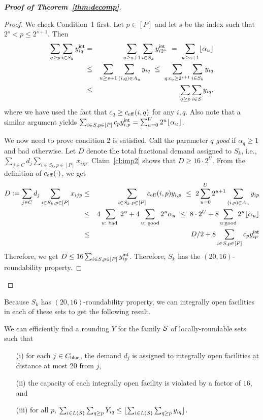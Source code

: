 \begin{proof}[{\bf Proof of Theorem~\ref{thm:decomp}}]
\begin{proof}
We check Condition~1 first. Let $p \in [P]$ and let $s$ be the index such that $2^s < p \leq 2^{s+1}$. Then
\begin{eqnarray*}
\sum_{q \geq p} \sum_{i \in S_k} \y_{iq} & = & \sum_{u \geq s+1} \sum_{i \in S_k} \y_{i2^u} \ = \ \sum_{u \geq s+1} \floor{\alpha_u }\\
& \leq & \sum_{u \geq s+1} \sum_{(i,q) \in A_u} y_{iq} \ \leq \ \sum_{q: c_q \geq 2^{s+1}} \sum_{i \in S_k} y_{iq} \\
& \leq & \sum_{q \geq p}\sum_{i\in S} y_{iq},
\end{eqnarray*}
 where we have used the fact that $c_q \geq c_{\mathrm{eff}}(i,q)$ for any $i,q$.
Also note that a similar argument yields $\sum_{i\in S,p\in [P]} c_p y^{{\mathsf{int}}}_{i,p} = \sum_{u=0}^U 2^u\lfloor\alpha_u\rfloor$.

We now need to prove condition 2 is satisfied. \smallskip
Call the parameter $q$ {\em good} if $\alpha_q \geq 1$ and bad otherwise. Let $D$ denote the total fractional demand assigned to $S_k$, i.e.,
$\sum_{j\in C} d_j \sum_{i\in S_k,p\in [P]} x_{ijp}$. Claim~\ref{cl:imp2} shows that $D \geq 16 \cdot 2^U$.
From the definition of $c_{\mathrm{eff}}(\cdot)$, we get
\begin{eqnarray*}
D := \sum_{j\in C} d_j \sum_{i\in S_k,p\in [P]} x_{ijp} & \leq &  \sum_{i\in S_k,p\in [P]} c_{\mathrm{eff}}(i,p)y_{i,p}	\  \leq \ 2 \sum_{u=0}^U 2^{u+1} \sum_{(i,p)\in A_u} y_{ip} \\
																				& \leq & 4\sum_{u: \textrm{ bad }} 2^u + 4\sum_{u: \textrm{ good}} 2^u \alpha_u
																				\  \leq \  8\cdot 2^U + 8\sum_{u: \textrm{good}}2^u \lfloor\alpha_u\rfloor  \\
																				& \leq & D/2 + 8\sum_{i\in S,p\in [P]}c_py^{{\mathsf{int}}}_{ip}
\end{eqnarray*}
Therefore, we get $D \leq 16\sum_{i\in S,p\in [P]} y^{{\mathsf{int}}}_{ip}$. Therefore, $S_k$ has the $(20,16)$-roundability property.
\end{proof}
\end{proof}

Because $S_k$ has $(20,16)$-roundability property, we can integrally open facilities in each of these sets to get the following result.
\begin{corollary} \label{cor:combine-local}
We can efficiently find a rounding $Y$ for the family ${\cal S}$ of locally-roundable sets such that
\begin{enumerate}
\item[(i)] for each $j \in C_{\mathsf{blue}}$, the demand $d_j$ is assigned to integrally open facilities at distance at most $20$ from $j$,
\item[(ii)] the capacity of each integrally open facility is violated by a factor of $16$, and
\item[(iii)] for all $p$, $\sum_{i \in L({\cal S})} \sum_{q \geq p} Y_{iq} \leq \lfloor\sum_{i \in L({\cal S})} \sum_{q \geq p} y_{iq}\rfloor$.
\end{enumerate}
\end{corollary}



